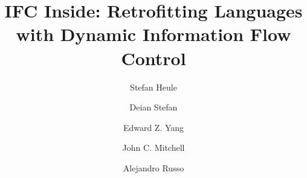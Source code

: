 \documentclass[9pt]{llncs}
\newif\ifextended
\newif\ifextendedtitle
\begin{document}


\title{
IFC Inside: Retrofitting Languages with Dynamic Information Flow Control
}
\ifextendedtitle
\subtitle{Extended Version}
\fi

\author{
 Stefan Heule \and
 Deian Stefan \and
 Edward Z. Yang \and
 John C. Mitchell \and
 Alejandro Russo
}

\maketitle




{\frenchspacing\scriptsize
  \setlength{\bibsep}{2pt}
  
  
}

\ifextended
\clearpage
\balance
\fi
\end{document}
